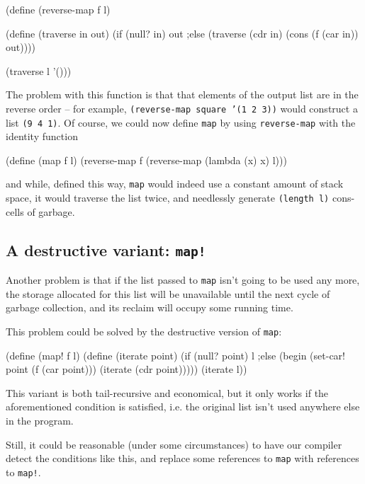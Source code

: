 \begin{Snippet}
  (define (reverse-map f l)
  
    (define (traverse in out)
      (if (null? in)
        out
      ;else
        (traverse (cdr in) (cons (f (car in)) out))))

    (traverse l '()))
\end{Snippet}

The problem with this function is that that elements of the output list
are in the reverse order -- for example, \texttt{(reverse-map square '(1 2 3))}
would construct a list \texttt{(9 4 1)}. Of course, we could now define
\texttt{map} by using \texttt{reverse-map} with the identity function

\begin{Snippet}
  (define (map f l)
    (reverse-map f (reverse-map (lambda (x) x) l)))
\end{Snippet}

and while, defined this way, \texttt{map} would indeed use a constant amount
of stack space, it would traverse the list twice, and needlessly generate
\texttt{(length l)} cons-cells of garbage.

\subsection{A destructive variant: \texttt{map!}}

Another problem is that if the list passed to \texttt{map} isn't going to
be used any more, the storage allocated for this list will be unavailable
until the next cycle of garbage collection, and its reclaim will occupy
some running time.

This problem could be solved by the destructive version of \texttt{map}:

\begin{Snippet}
  (define (map! f l)
    (define (iterate point)
      (if (null? point)
        l
      ;else
        (begin
          (set-car! point (f (car point)))
          (iterate (cdr point)))))
    (iterate l))
\end{Snippet}

This variant is both tail-recursive and economical, but it only works
if the aforementioned condition is satisfied, i.e. the original list
isn't used anywhere else in the program.

Still, it could be reasonable (under some circumstances) to have our
compiler detect the conditions like this, and replace some references
to \texttt{map} with references to \texttt{map!}.

